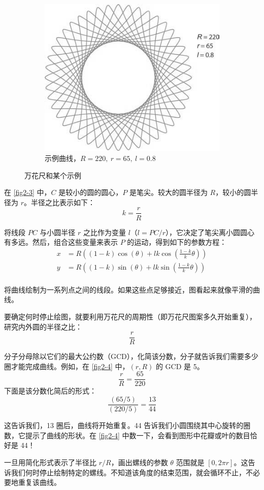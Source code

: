 \begin{figure}
\begin{subfigure}[b]{.45\textwidth}
        \includegraphics[width=\textwidth]{../img/fig2-4.png}
        \caption{示例曲线，$R=220,~r=65,~l=0.8$}
        \label{fig2-4}
    \end{subfigure}
    \caption{万花尺和某个示例}
\end{figure}

在 \autoref{fig2-3} 中，$C$ 是较小的圆的圆心，$P$ 是笔尖。较大的圆半径为 $R$，较小的圆半径为 $r$。半径之比表示如下：
$$k=\frac{r}{R}$$

将线段 $PC$ 与小圆半径 $r$ 之比作为变量 $l$（$l = PC / r$），它决定了笔尖离小圆圆心有多远。然后，组合这些变量来表示 $P$ 的运动，得到如下的参数方程：
\begin{equation}
    \begin{aligned}
        x & =R\left((1-k)\cos(\theta)+lk\cos\left(\frac{1-k}{k}\theta\right)\right) \\
        y & =R\left((1-k)\sin(\theta)+lk\sin\left(\frac{1-k}{k}\theta\right)\right) \\
    \end{aligned}
\end{equation}

将曲线绘制为一系列点之间的线段。如果这些点足够接近，图看起来就像平滑的曲线。

要确定何时停止绘图，就要利用万花尺的周期性（即万花尺图案多久开始重复），研究内外圆的半径之比：
$$\frac{r}{R}$$

分子分母除以它们的最大公约数（GCD），化简该分数，分子就告诉我们需要多少圈才能完成曲线。例如，在 \autoref{fig2-4} 中，$(r, R)$ 的 GCD 是 5。
$$\frac{r}{R}=\frac{65}{220}$$
下面是该分数化简后的形式：
$$\frac{(65/5)}{(220/5)}=\frac{13}{44}$$

这告诉我们，13 圈后，曲线将开始重复。44 告诉我们小圆围绕其中心旋转的圈数，它提示了曲线的形状。在 \autoref{fig2-4} 中数一下，会看到图形中花瓣或叶的数目恰好是 44！

一旦用简化形式表示了半径比 $r/R$，画出螺线的参数 $\theta$ 范围就是 $[0, 2\pi r]$。这告诉我们何时停止绘制特定的螺线。不知道该角度的结束范围，就会循环不止，不必要地重复该曲线。

